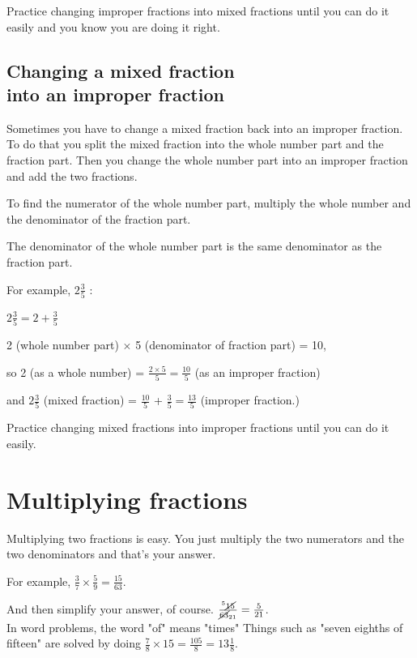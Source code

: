 \documentclass[16pt]{article}
\begin{document}
\begin{spacing}{1.25}
Practice changing improper fractions into mixed fractions until you can do it easily and you know you are doing it right.

\pagebreak

\subsection*{Changing a mixed fraction \\ into an improper fraction}
Sometimes you have to change a mixed fraction back into an improper fraction. To do that you split the mixed fraction into the whole number part and the fraction part. Then you change the whole number part into an improper fraction and add the two fractions.

To find the numerator of the whole number part, multiply the whole number and the denominator of the fraction part.

The denominator of the whole number part is the same denominator as the fraction part.

\begin{doublespace}
For example, $2 \frac{3}{5}$ :

$2 \frac{3}{5} = 2 + \frac{3}{5}$

2 (whole number part) $\times$ 5 (denominator of fraction part) = 10,

so 2 (as a whole number) = $\frac{{2 \times 5}}{5} = \frac{10}{5}$ (as an improper fraction)

and $2 \frac{3}{5}$ (mixed fraction) = $\frac{10}{5}$ + $\frac{3}{5} = \frac{13}{5}$ (improper fraction.)
\end{doublespace}

\vspace{28pt}
Practice changing mixed fractions into improper fractions until you can do it easily.

\pagebreak

\section{Multiplying fractions}
Multiplying two fractions is easy. You just multiply the two numerators and the two denominators and that’s your answer.

For example, $\frac{3}{7} \times \frac{5}{9} = \frac{15}{63}$.

And then simplify your answer, of course. $\frac{^5\cancel{15}}{\cancel{63}_{21}} = \frac{5}{21}$.\\

In word problems, the word "of" means "times" Things such as "seven eighths of fifteen" are solved by doing $\frac{7}{8}\times15=\frac{105}{8}=13\frac{1}{8}$.\\


\end{spacing}
\end{document}
